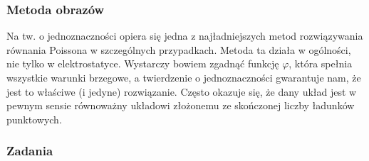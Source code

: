 \documentclass[../main.tex]{subfiles}
\begin{document}
\subsubsection{Metoda obrazów}
Na tw. o jednoznaczności opiera się jedna z najładniejszych metod rozwiązywania równania Poissona w szczególnych przypadkach. Metoda ta działa w ogólności, nie tylko w elektrostatyce. Wystarczy bowiem zgadnąć funkcję \(\varphi\), która spełnia wszystkie warunki brzegowe, a twierdzenie o jednoznaczności gwarantuje nam, że jest to właściwe (i jedyne) rozwiązanie. Często okazuje się, że dany układ jest w pewnym sensie równoważny układowi złożonemu ze skończonej liczby ładunków punktowych.
\subsubsection*{Zadania}
\end{document}
